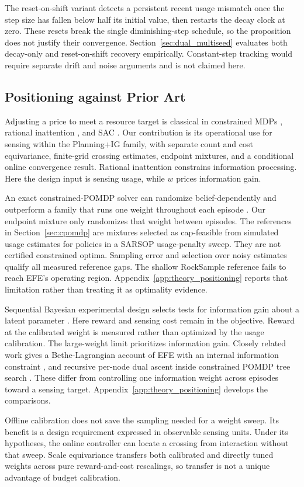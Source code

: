 The reset-on-shift variant detects a persistent recent usage mismatch once the step size has fallen below half its initial value, then restarts the decay clock at zero. These resets break the single diminishing-step schedule, so the proposition does not justify their convergence. Section~\ref{sec:dual_multiseed} evaluates both decay-only and reset-on-shift recovery empirically. Constant-step tracking would require separate drift and noise arguments and is not claimed here.

\subsection{Positioning against Prior Art}
\label{sec:budget_positioning}

Adjusting a price to meet a resource target is classical in constrained MDPs \citep{altman1999}, rational inattention \citep{sims2003,matejka2015}, and SAC \citep{haarnoja2018sac}. Our contribution is its operational use for sensing within the Planning+IG family, with separate count and cost equivariance, finite-grid crossing estimates, endpoint mixtures, and a conditional online convergence result. Rational inattention constrains information processing. Here the design input is sensing usage, while $w$ prices information gain.

An exact constrained-POMDP solver can randomize belief-dependently and outperform a family that runs one weight throughout each episode \citep{kim2011cpomdp}. Our endpoint mixture only randomizes that weight between episodes. The references in Section~\ref{sec:cpomdp} are mixtures selected as cap-feasible from simulated usage estimates for policies in a SARSOP usage-penalty sweep. They are not certified constrained optima. Sampling error and selection over noisy estimates qualify all measured reference gaps. The shallow RockSample reference fails to reach EFE's operating region. Appendix~\ref{app:theory_positioning} reports that limitation rather than treating it as optimality evidence.

Sequential Bayesian experimental design selects tests for information gain about a latent parameter \citep{lindley1956,foster2021dad}. Here reward and sensing cost remain in the objective. Reward at the calibrated weight is measured rather than optimized by the usage calibration. The large-weight limit prioritizes information gain. Closely related work gives a Bethe-Lagrangian account of EFE with an internal information constraint \citep{kouw2026bethe}, and recursive per-node dual ascent inside constrained POMDP tree search \citep{stocco2024recursive}. These differ from controlling one information weight across episodes toward a sensing target. Appendix~\ref{app:theory_positioning} develops the comparisons.

Offline calibration does not save the sampling needed for a weight sweep. Its benefit is a design requirement expressed in observable sensing units. Under its hypotheses, the online controller can locate a crossing from interaction without that sweep. Scale equivariance transfers both calibrated and directly tuned weights across pure reward-and-cost rescalings, so transfer is not a unique advantage of budget calibration.
